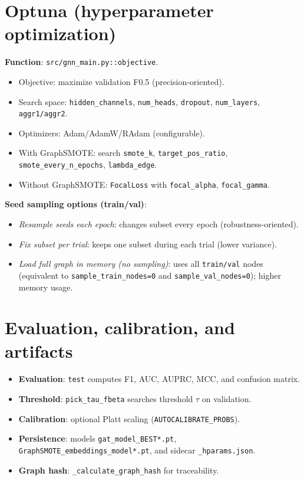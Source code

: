 \section{Optuna (hyperparameter optimization)}
\label{sec:optuna}
\textbf{Function}: \texttt{src/gnn\_main.py::objective}.
\begin{itemize}[leftmargin=*]
  \item Objective: maximize validation F0.5 (precision-oriented).
  \item Search space: \texttt{hidden\_channels}, \texttt{num\_heads}, \texttt{dropout}, \texttt{num\_layers}, \texttt{aggr1/aggr2}.
  \item Optimizers: Adam/AdamW/RAdam (configurable).
  \item With GraphSMOTE: search \texttt{smote\_k}, \texttt{target\_pos\_ratio}, \texttt{smote\_every\_n\_epochs}, \texttt{lambda\_edge}.
  \item Without GraphSMOTE: \texttt{FocalLoss} with \texttt{focal\_alpha}, \texttt{focal\_gamma}.
\end{itemize}
\textbf{Seed sampling options (train/val)}:
\begin{itemize}[leftmargin=*]
  \item \emph{Resample seeds each epoch}: changes subset every epoch (robustness-oriented).
  \item \emph{Fix subset per trial}: keeps one subset during each trial (lower variance).
  \item \emph{Load full graph in memory (no sampling)}: uses all \texttt{train/val} nodes (equivalent to \texttt{sample\_train\_nodes=0} and \texttt{sample\_val\_nodes=0}); higher memory usage.
\end{itemize}

\section{Evaluation, calibration, and artifacts}
\begin{itemize}[leftmargin=*]
  \item \textbf{Evaluation}: \texttt{test} computes F1, AUC, AUPRC, MCC, and confusion matrix.
  \item \textbf{Threshold}: \texttt{pick\_tau\_fbeta} searches threshold \(\tau\) on validation.
  \item \textbf{Calibration}: optional Platt scaling (\texttt{AUTOCALIBRATE\_PROBS}).
  \item \textbf{Persistence}: models \texttt{gat\_model\_BEST*.pt}, \texttt{GraphSMOTE\_embeddings\_model*.pt}, and sidecar \texttt{\_hparams.json}.
  \item \textbf{Graph hash}: \texttt{\_calculate\_graph\_hash} for traceability.
\end{itemize}

